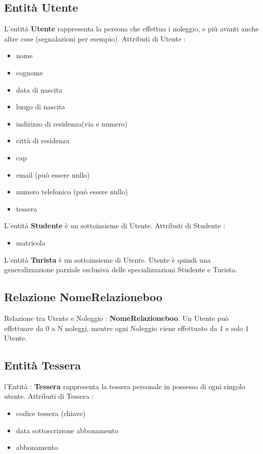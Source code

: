 \documentclass[a4paper,twoside]{article}
\begin{document}
\subsection{Entità Utente}
L'entità \textbf{Utente} rappresenta la persona che effettua i noleggio, e più avanti anche altre cose (segnalazioni per esempio).\newline
Attributi di Utente :
\begin{itemize}
 \item nome
 \item cognome
 \item data di nascita
 \item luogo di nascita
 \item indirizzo di residenza(via e numero)
 \item città di residenza
 \item cap
 \item email (può essere nullo)
 \item numero telefonico (può essere nullo)
 \item tessera
\end{itemize}
L'entità \textbf{Studente} è un sottoinsieme di Utente.\newline
Attributi di Studente :
\begin{itemize}
 \item matricola
\end{itemize}
L'entità \textbf{Turista} è un sottoinsieme di Utente.\newline
Utente è quindi una generalizzazione parziale esclusiva delle specializzazioni Studente e Turista.

\subsection{Relazione NomeRelazioneboo}
Relazione tra Utente e Noleggio : \textbf{NomeRelazioneboo}.\newline
Un Utente può effettuare da 0 a N noleggi, mentre ogni Noleggio viene effettuato da 1 e solo 1 Utente.

\subsection{Entità Tessera}
l'Entità : \textbf{Tessera} rappresenta la tessera personale in possesso di ogni singolo utente.\newline
Attributi di Tessera :
\begin{itemize}
 \item codice tessera (chiave)
 \item data sottoscrizione abbonamento
 \item abbonamento
\end{itemize}
\end{document}
